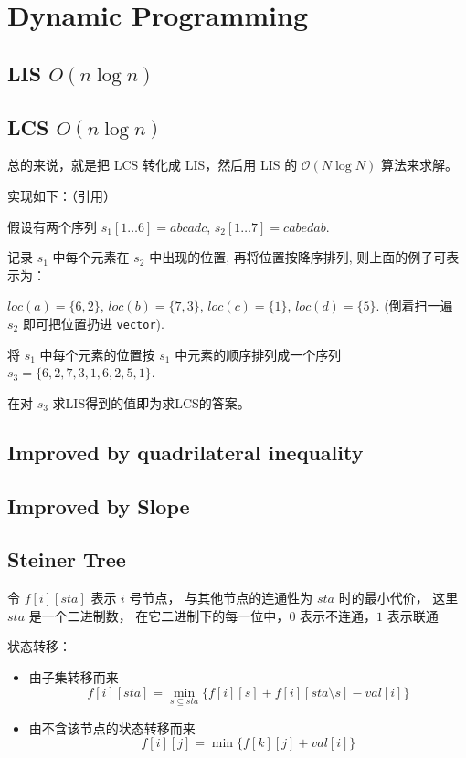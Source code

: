 \section{Dynamic Programming}

\subsection{LIS $O(n\log{n})$}


\subsection{LCS $O(n\log{n})$}

总的来说，就是把 LCS 转化成 LIS，然后用 LIS 的 $\mathcal{O}(N\log{N})$ 算法来求解。

实现如下：（引用）

假设有两个序列 $s_1[1\dots{6}] = abcadc$, $s_2[1\dots{7}] = cabedab$.

记录 $s_1$ 中每个元素在 $s_2$ 中出现的位置, 再将位置按降序排列, 则上面的例子可表示为：

$loc(a) = \{ 6, 2 \}$,
$loc( b ) = \{ 7, 3 \}$,
$loc( c ) = \{ 1 \}$, 
$loc( d ) = \{ 5 \}$.
(倒着扫一遍 $s_2$ 即可把位置扔进 \verb|vector|).

将 $s_1$ 中每个元素的位置按 $s_1$ 中元素的顺序排列成一个序列
$s_3 = \{ 6, 2, 7, 3, 1, 6, 2, 5, 1 \}$.

在对 $s_3$ 求LIS得到的值即为求LCS的答案。


\subsection{Improved by quadrilateral inequality}


\subsection{Improved by Slope}


\subsection{Steiner Tree}
令 $f[i][sta]$ 表示 $i$ 号节点，
与其他节点的连通性为 $sta$ 时的最小代价，
这里 $sta$ 是一个二进制数，
在它二进制下的每一位中，$0$ 表示不连通，$1$ 表示联通

状态转移：
\begin{itemize}
    \item 由子集转移而来
    \[
        f[i][sta] = \min_{s \subseteq sta}\{f[i][s] + f[i][sta \setminus s] - val[i]\}
    \]
    \item 由不含该节点的状态转移而来
    \[
        f[i][j] = \min\{f[k][j] + val[i]\}
    \]
\end{itemize}


